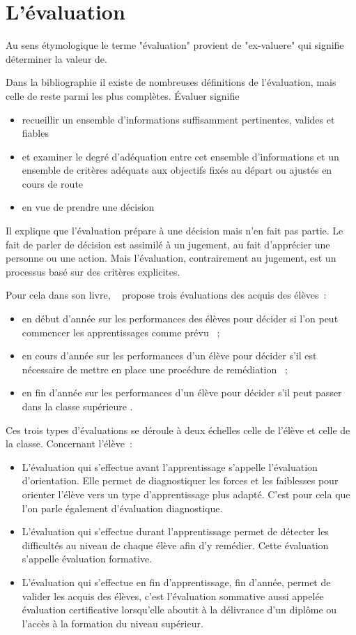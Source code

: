 \section{L'évaluation}

Au sens étymologique le terme "évaluation" provient de "ex-valuere" qui signifie déterminer la valeur de.

Dans la bibliographie il existe de nombreuses définitions de l'évaluation, mais celle de \cite{de_ketele_levaluation_1989} reste parmi les plus complètes.
\og Évaluer signifie
\begin{itemize} 
\item recueillir un ensemble d'informations suffisamment pertinentes, valides et fiables
\item et examiner le degré d'adéquation entre cet ensemble d'informations et un ensemble de critères adéquats aux objectifs fixés au départ ou ajustés en cours de route
\item en vue de prendre une décision \fg
\end{itemize}


Il explique que l'évaluation prépare à une décision mais n'en fait pas partie. 
Le fait de parler de décision est assimilé à un jugement, au fait d'apprécier une personne ou une action. 
Mais l'évaluation, contrairement au jugement, est un processus basé sur des critères explicites.

Pour cela dans son livre, ~\cite{roegiers_lecole_2010} propose trois évaluations des acquis des élèves~:
\begin{itemize}
\item \og en début d'année sur les performances des élèves pour décider si l'on peut commencer les apprentissages comme prévu \fg ~;
\item \og en cours d'année sur les performances d'un élève pour décider s'il est nécessaire de mettre en place une procédure de remédiation \fg ~;
\item \og en fin d'année sur les performances d'un élève pour décider s'il peut passer dans la classe supérieure \fg .
\end{itemize}

Ces trois types d'évaluations se déroule à deux échelles celle de l'élève et celle de la classe.
Concernant l'élève~:
\begin{itemize}
\item L'évaluation qui s'effectue avant l'apprentissage s'appelle l'évaluation d'orientation. Elle permet de diagnostiquer les forces et les faiblesses pour orienter l'élève vers un type d'apprentissage plus adapté. C'est pour cela que l'on parle également d'évaluation diagnostique.
\item L'évaluation qui s'effectue durant l'apprentissage permet de détecter les difficultés au niveau de chaque élève afin d'y remédier. Cette évaluation s'appelle évaluation formative.
\item L'évaluation qui s'effectue en fin d'apprentissage, fin d'année, permet de valider les acquis des élèves, c'est l'évaluation sommative aussi appelée évaluation certificative lorsqu'elle aboutit à la délivrance d'un diplôme ou l'accès à la formation du niveau supérieur.
\end{itemize}


